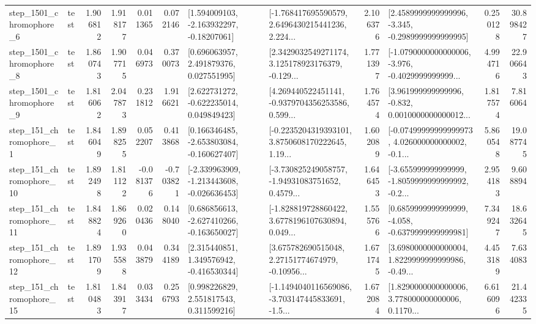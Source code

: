 \begin{tabular}{llrrrrllrlrr}
  step\_1501\_chromophore\_6 &      test &      1.906812 &    1.918177 &      0.011365 &  0.072146 &    [1.594009103, -2.163932297, -0.18207061] &  [-1.768417695590579, 2.6496430215441236, 2.224... &       2.106376 &  [2.4589999999999996, -3.345, -0.2989999999999995] &            0.250128 &         30.898427 \\
  step\_1501\_chromophore\_8 &      test &      1.860743 &    1.907715 &      0.046973 &  0.370073 &     [0.696063957, 2.491879376, 0.027551995] &  [2.3429032549271174, 3.125178923176379, -0.129... &       1.771397 &  [-1.0790000000000006, -3.976, -0.4029999999999... &            4.994716 &         22.906643 \\
  step\_1501\_chromophore\_9 &      test &      1.816062 &    2.047873 &      0.231812 &  1.916621 &    [2.622731272, -0.622235014, 0.049849423] &  [4.269440522451141, -0.9379704356253586, 0.599... &       1.764574 &  [3.961999999999996, -0.832, 0.0010000000000012... &            1.817574 &          7.816064 \\
   step\_151\_chromophore\_1 &      test &      1.846049 &    1.898255 &      0.052207 &  0.413868 &   [0.166346485, -2.653803084, -0.160627407] &  [-0.2235204319393101, 3.8750608170222645, 1.19... &       1.602089 &  [-0.07499999999999973, 4.026000000000002, -0.1... &            5.860548 &         19.087745 \\
  step\_151\_chromophore\_10 &      test &      1.892498 &    1.811122 &     -0.081376 & -0.703821 &  [-2.339963909, -1.213443608, -0.026636453] &  [-3.730825249058757, -1.94931083751652, 0.4579... &       1.646453 &  [-3.655999999999999, -1.8059999999999992, -0.2... &            2.954183 &          9.608894 \\
  step\_151\_chromophore\_11 &      test &      1.848824 &    1.869260 &      0.020436 &  0.148040 &   [0.686856613, -2.627410266, -0.163650027] &  [-1.828819728860422, 3.6778196107630894, 0.049... &       1.555766 &  [0.6859999999999999, -4.058, -0.6379999999999981] &            7.349247 &         18.632645 \\
  step\_151\_chromophore\_12 &      test &      1.891709 &    1.935588 &      0.043879 &  0.344189 &    [2.315440851, 1.349576942, -0.416530344] &  [3.675782690515048, 2.27151774674979, -0.10956... &       1.671745 &  [3.6980000000000004, 1.8229999999999986, -0.49... &            4.453189 &          7.634083 \\
  step\_151\_chromophore\_15 &      test &      1.810483 &    1.843917 &      0.033434 &  0.256793 &     [0.998226829, 2.551817543, 0.311599216] &  [-1.1494040116569086, -3.703147445833691, -1.5... &       1.672084 &  [1.8290000000000006, 3.778000000000006, 0.1170... &            6.616096 &         21.442335 \\

\end{tabular}
